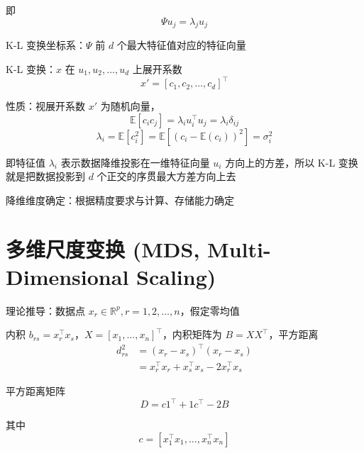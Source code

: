 \documentclass[openany]{ctexbook}
\theoremstyle{kaiti}
\theoremstyle{normal}
\begin{document}
即
\begin{equation}
\Psi u_j=\lambda_ju_j
\end{equation}

K-L 变换坐标系：$\Psi$ 前 $d$ 个最大特征值对应的特征向量

K-L 变换：$x$ 在 $u_1,u_2,\dots ,u_d$ 上展开系数
\begin{equation}
x'=\left[c_1,c_2,\dots ,c_d \right] ^{\top}
\end{equation}

性质：视展开系数 $x'$ 为随机向量，
\begin{equation}
\mathbb{E} \left[c_ic_j \right] =\lambda_iu_{i}^{\top}u_j=\lambda_i\delta_{ij}
\end{equation}
\begin{equation}
\lambda_i=\mathbb{E} \left[c_{i}^{2} \right] =\mathbb{E} \left[\left(c_i-\mathbb{E} \left(c_i \right)\right)^2 \right] =\sigma_{i}^{2}
\end{equation}

即特征值 $\lambda_i$ 表示数据降维投影在一维特征向量 $u_i$ 方向上的方差，所以 K-L 变换就是把数据投影到 $d$ 个正交的序贯最大方差方向上去

降维维度确定：根据精度要求与计算、存储能力确定

\section{多维尺度变换 (MDS, Multi-Dimensional Scaling) }

理论推导：数据点 $x_r\in \mathbb{R} ^p, r=1,2,\dots ,n$，假定零均值

内积 $b_{rs}=x_{r}^{\top}x_s$，$X=\left[x_1,\dots ,x_n \right] ^{\top}$，内积矩阵为 $B=XX^{\top}$，平方距离
\begin{equation}
\begin{aligned}
  d_{rs}^{2}
  &=\left(x_r-x_s \right)^{\top}\left(x_r-x_s \right)\\
  &=x_{r}^{\top}x_r+x_{s}^{\top}x_s-2x_{r}^{\top}x_s
\end{aligned}
\end{equation}

平方距离矩阵
\begin{equation}
D=c1^{\top}+1c^{\top}-2B
\end{equation}

其中
\begin{equation}
c=\left[x_{1}^{\top}x_1,\dots ,x_{n}^{\top}x_n \right]
\end{equation}
\end{document}
